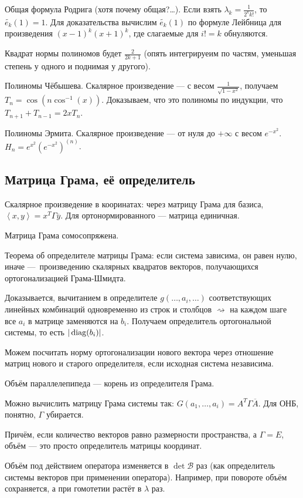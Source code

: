 \documentclass[12pt, a4paper]{article}
\begin{document}
Общая формула Родрига (хотя почему общая?…). Если взять $\lambda_k = \frac{1}{2^k k!}$, то $\tilde{e_k}(1) = 1$. 
Для доказательства вычислим $\tilde{e_k}(1)$ по формуле Лейбница для произведения $(x - 1)^k (x + 1)^k$, где слагаемые для $i != k$ обнуляются.

Квадрат нормы полиномов будет $\frac{2}{2k + 1}$ (опять интегрируеим по частям, уменьшая степень у одного и поднимая у другого).

Полиномы Чёбышева. Скалярное произведение — с весом $\frac{1}{\sqrt{1 - x^2}}$, получаем $T_n = \cos(n \cos^{-1}(x))$.
Доказываем, что это полиномы по индукции, что $T_{n + 1} + T_{n - 1} = 2x T_n$.

Полиномы Эрмита. Скалярное произведение — от нуля до $+\infty$ с весом $e^{-x^2}$.
$H_n = e^{x^2} \left( e^{-x^2} \right)^(n)$.


\subsection{Матрица Грама, её определитель}

Скалярное произведение в кооринатах: через матрицу Грама для базиса, $\left\langle x, y \right\rangle = x^T \Gamma \overline{y}$.
Для ортонормированного — матрица единичная.

Матрица Грама сомосопряжена.

Теорема об определителе матрицы Грама: если система зависима, он равен нулю, 
иначе — произведению скалярных квадратов векторов, получающихся ортогонализацией Грама-Шмидта.

Доказывается, вычитанием в определителе $g(…, a_i, …)$ соответствующих линейных комбинаций одновременно из строк и столбцов 
$\rightsquigarrow$ на каждом шаге все $a_i$ в матрице заменяются на $b_i$. Получаем определитель ортогональной системы, то есть $| \operatorname{diag} (b_i) |$.

Можем посчитать норму ортогонализации нового вектора через отношение матриц нового и старого определителя, если исходная система независима.

Объём параллелепипеда — корень из определителя Грама.

Можно вычислить матрицу Грама системы так: $G(a_1, …, a_i) = A^T \Gamma \overline{A}$. Для ОНБ, понятно, $\Gamma$ убирается.

Причём, если количество векторов равно размерности пространства, а $\Gamma = E$, объём — это просто определитель матрицы координат.

Объём под действием оператора изменяется в $\det \mathcal{B}$ раз (как определитель системы векторов при применении оператора). 
Например, при повороте объём сохраняется, а при гомотетии растёт в $\lambda$ раз.
\end{document}
